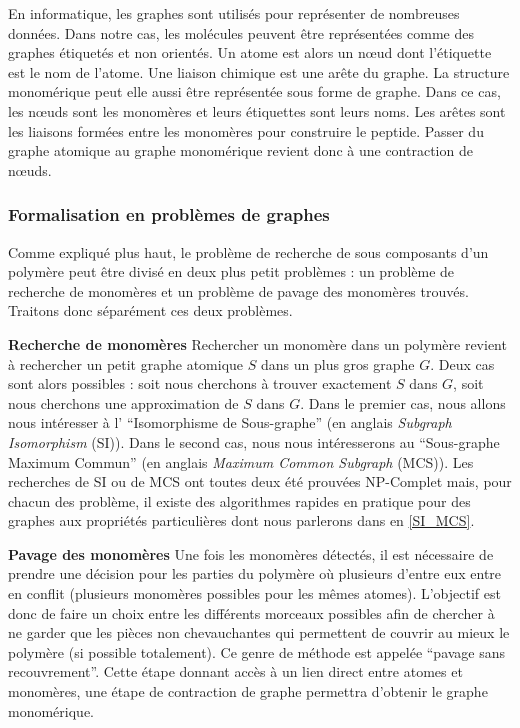 En informatique, les graphes sont utilisés pour représenter de nombreuses données.
Dans notre cas, les molécules peuvent être représentées comme des graphes étiquetés et non orientés.
Un atome est alors un n\oe{}ud dont l'étiquette est le nom de l'atome.
Une liaison chimique est une arête du graphe.
La structure monomérique peut elle aussi être représentée sous forme de graphe.
Dans ce cas, les n\oe{}uds sont les monomères et leurs étiquettes sont leurs noms.
Les arêtes sont les liaisons formées entre les monomères pour construire le peptide.
Passer du graphe atomique au graphe monomérique revient donc à une contraction de n\oe{}uds.


\subsubsection{Formalisation en problèmes de graphes}

Comme expliqué plus haut, le problème de recherche de sous composants d'un polymère peut être divisé en deux
plus petit problèmes : un problème de recherche de monomères et un problème de pavage des monomères trouvés. Traitons
donc séparément ces deux problèmes.

\textbf{Recherche de monomères}  Rechercher un monomère dans un polymère revient à rechercher un petit graphe atomique
$S$ dans un plus gros graphe $G$. Deux cas sont alors possibles : soit nous cherchons à trouver exactement $S$ dans
$G$, soit nous cherchons une approximation de $S$ dans $G$. Dans le premier cas, nous allons nous intéresser à l'
``Isomorphisme de Sous-graphe'' (en anglais \textit{Subgraph Isomorphism} (SI)). Dans le second cas, nous nous intéresserons au
``Sous-graphe Maximum Commun'' (en anglais \textit{Maximum Common Subgraph} (MCS)). Les recherches de SI ou de MCS ont toutes
deux été prouvées NP-Complet mais, pour chacun des problème, il existe des algorithmes rapides en pratique pour des graphes
aux propriétés particulières dont nous parlerons dans en \ref{SI_MCS}.

\textbf{Pavage des monomères}  Une fois les monomères détectés, il est nécessaire de prendre une décision pour les parties du polymère où plusieurs d'entre eux entre en conflit (plusieurs monomères possibles pour les mêmes atomes).
L'objectif est donc de faire un choix entre les différents morceaux possibles afin de chercher à ne garder que les pièces non chevauchantes qui permettent de couvrir au mieux le polymère (si possible totalement).
Ce genre de méthode est appelée ``pavage sans recouvrement''.
Cette étape donnant accès à un lien direct entre atomes et monomères, une étape de contraction de graphe permettra d'obtenir le graphe monomérique.




